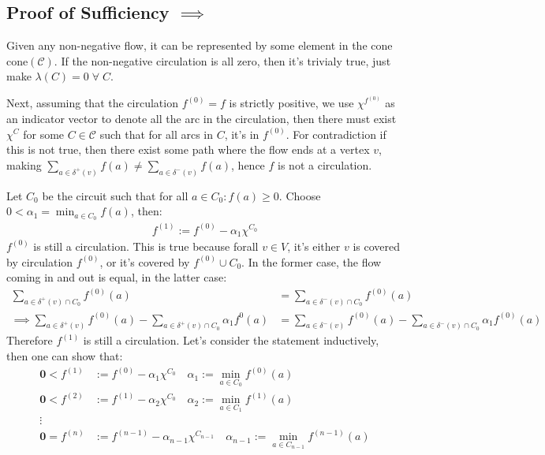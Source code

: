 \documentclass[]{article}
\theoremstyle{definition}
\begin{document}
    \subsection{Proof of Sufficiency $\implies$}
        Given any non-negative flow, it can be represented by some element in the cone $\text{cone}(\mathcal C)$. If the non-negative circulation is all zero, then it's trivialy true, just make $\lambda(C) = 0 \;\forall\; C$.
        \par
        Next, assuming that the circulation $f^{(0)} = f$ is strictly positive, we use $\chi^{f^{(0)}}$ as an indicator vector to denote all the arc in the circulation, then there must exist $\chi^{C}$ for some $C \in \mathcal C$ such that for all arcs in $C$, it's in $f^{(0)}$. For contradiction if this is not true, then there exist some path where the flow ends at a vertex $v$, making $\sum_{a\in\delta^+(v)} f(a) \neq \sum_{a\in \delta^-(v)}^{}f(a)$, hence $f$ is not a circulation. 
        \par
        Let $C_0$ be the circuit such that for all $a\in C_0: f(a) \ge 0$. Choose $0 <\alpha_1 = \min_{a \in C_0}f(a)$, then: 
        \begin{align}
            f^{(1)} := f^{(0)} - \alpha_1 \chi^{C_0}
        \end{align}
        $f^{(0)}$ is still a circulation. This is true because forall $v\in V$, it's either $v$ is covered by circulation $f^{(0)}$, or it's covered by $f^{(0)}\cup C_0$. In the former case, the flow coming in and out is equal, in the latter case: 
        \begin{align}
            \sum_{a\in\delta^+(v)\cap C_0}^{} f^{(0)}(a) &= \sum_{a\in \delta^-(v)\cap C_0}^{}f^{(0)}(a)
            \\
            \implies \sum_{a\in \delta^+(v)}^{}f^{(0)}(a) - \sum_{a \in \delta^+(v)\cap C_0}^{}\alpha_1 f^{0}(a) &= 
            \sum_{a\in \delta^-(v)}^{}f^{(0)}(a) - \sum_{a \in \delta^-(v)\cap C_0}^{}\alpha_1 f^{(0)}(a) 
        \end{align}
        Therefore $f^{(1)}$ is still a circulation. Let's consider the statement inductively, then one can show that: 
        \begin{align}
            \mathbf 0 < f^{(1)} &:= f^{(0)} - \alpha_1 \chi^{C_0}\quad \alpha_1 := \min_{a \in C_0}f^{(0)}(a)
            \\
            \mathbf 0 < f^{(2)} &:= f^{(1)} - \alpha_2 \chi^{C_0}\quad \alpha_2 := \min_{a \in C_1}f^{(1)}(a)
            \\
            \vdots 
            \\
            \mathbf 0 = f^{(n)} &:= f^{(n - 1)} - \alpha_{n - 1} \chi^{C_{n - 1}} \quad \alpha_{n - 1} := \min_{a \in C_{n - 1}}f^{(n - 1)}(a)
        \end{align}
\end{document}
